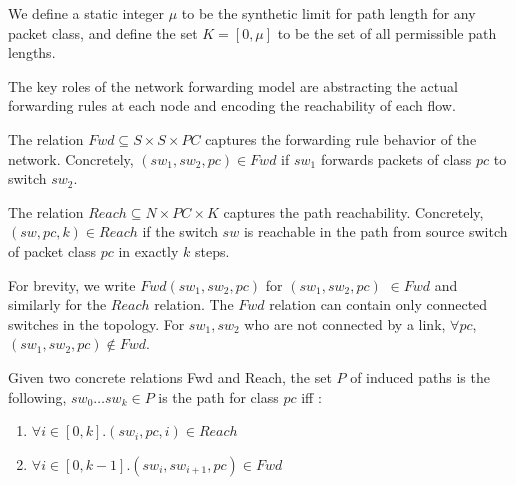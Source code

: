 We define a static integer $\mu$ to be the synthetic limit for path length for any packet class, and define the set $K = [0, \mu]$ to be the set of all permissible path lengths.
 

The key roles of the network forwarding model are abstracting the actual forwarding rules at each node and encoding the reachability of each flow. 
\begin{mydef}
\label{def:fwd}
The relation $Fwd \subseteq S \times S \times PC $ captures the forwarding rule behavior of the network. 
Concretely, $(sw_1, sw_2, pc)\in Fwd$ if 
$sw_1$ forwards packets of class $pc$ to switch $sw_2$. 
\end{mydef}
\begin{mydef}
\label{def:reach}
	The relation $Reach \subseteq N \times PC \times K$ captures the path reachability.   
	Concretely, $(sw, pc, k)\in Reach$ if 
	the switch $sw$ is reachable in the path from source switch of packet class $pc$ in exactly $k$ steps.  
\end{mydef}
For brevity, we write $Fwd(sw_1, sw_2, pc)$ for $(sw_1, sw_2, pc) $ $\in Fwd$ and similarly for the $Reach$ relation. The $Fwd$ relation can contain only connected switches in the topology. For $sw_1, sw_2$ who are not connected by a link, $\forall pc$, $(sw_1,sw_2,pc) \notin Fwd$. 

Given two concrete relations Fwd and Reach, the set $P$ of induced paths is the following, 
$sw_0 \ldots sw_k \in P$ is the path for class $pc$ iff : 
\begin{enumerate}
	\item $\forall i \in [0,k]. (sw_i, pc, i) \in Reach$
	\item $\forall i \in [0, k - 1]. (sw_i, sw_{i+1}, pc) \in Fwd$
\end{enumerate}


